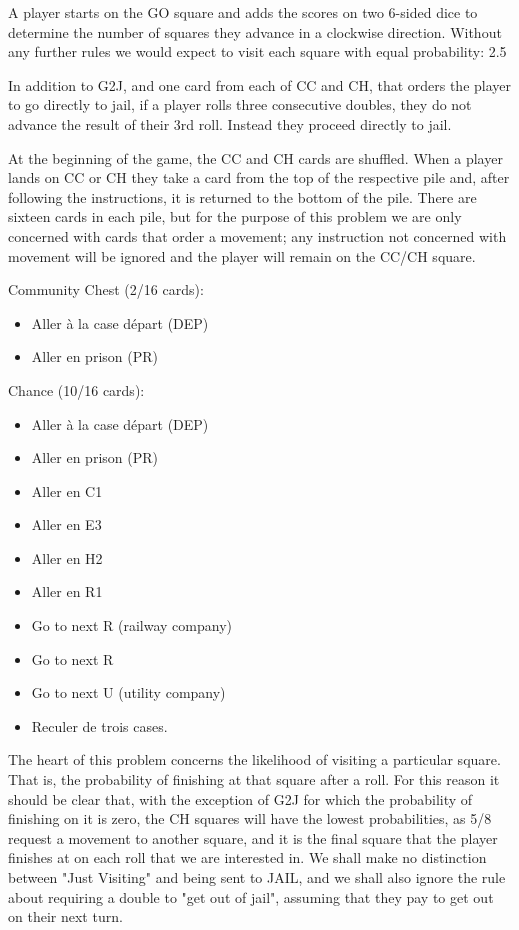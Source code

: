 A player starts on the GO square and adds the scores on two 6-sided dice to determine the number of squares they advance in a clockwise direction. Without any further rules we would expect to visit each square with equal probability: 2.5%

In addition to G2J, and one card from each of CC and CH, that orders the player to go directly to jail, if a player rolls three consecutive doubles, they do not advance the result of their 3rd roll. Instead they proceed directly to jail.

At the beginning of the game, the CC and CH cards are shuffled. When a player lands on CC or CH they take a card from the top of the respective pile and, after following the instructions, it is returned to the bottom of the pile. There are sixteen cards in each pile, but for the purpose of this problem we are only concerned with cards that order a movement; any instruction not concerned with movement will be ignored and the player will remain on the CC/CH square.

Community Chest (2/16 cards):
\begin{itemize}
    \item Aller à la case départ (DEP)
    \item Aller en prison (PR)
\end{itemize}

Chance (10/16 cards):
\begin{itemize}
    \item Aller à la case départ (DEP)
    \item Aller en prison (PR)
    \item Aller en C1
    \item Aller en E3
    \item Aller en H2
    \item Aller en R1
    \item Go to next R (railway company)
    \item Go to next R
    \item Go to next U (utility company)
    \item Reculer de trois cases.
\end{itemize}

The heart of this problem concerns the likelihood of visiting a particular square. That is, the probability of finishing at that square after a roll. For this reason it should be clear that, with the exception of G2J for which the probability of finishing on it is zero, the CH squares will have the lowest probabilities, as 5/8 request a movement to another square, and it is the final square that the player finishes at on each roll that we are interested in. We shall make no distinction between "Just Visiting" and being sent to JAIL, and we shall also ignore the rule about requiring a double to "get out of jail", assuming that they pay to get out on their next turn.


